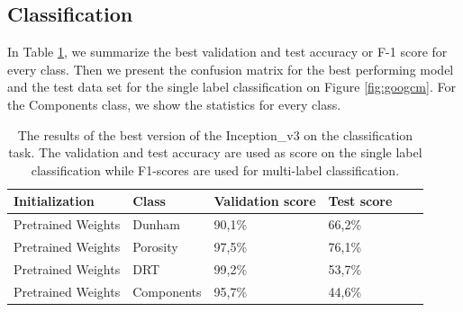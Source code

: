 \subsection{Classification}
In Table \ref{tab:googbest}, we summarize the best validation and test accuracy or F-1 score for every class. Then we present the confusion matrix for the best performing model and the test data set for the single label classification on Figure \ref{fig:googcm}. For the Components class, we show the statistics for every class. 

\begin{table}
\caption{\label{tab:googbest} The results of the best version of the Inception\_v3 on the classification task. The validation and test accuracy are used as score on the single label classification while F1-scores are used for multi-label classification.}
\centering
\begin{tabular}[b]{| l | l | l | l | l |}
\hline
    Initialization & Class & Validation score & Test score \ \\ \hline
    Pretrained Weights & Dunham &  90,1\%  & 66,2\% \\ \hline
    Pretrained Weights & Porosity & 97,5\%  &  76,1\% \\ \hline
    Pretrained Weights &DRT & 99,2\% & 53,7\% \\ \hline
    Pretrained Weights &Components & 95,7\% &  44,6\% \\ \hline
\end{tabular} 
\end{table}


